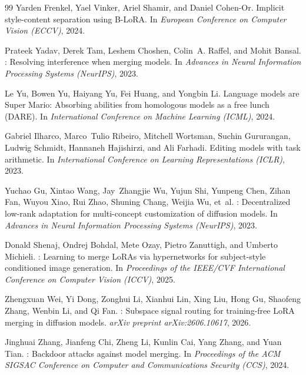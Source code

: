\documentclass[10pt,twocolumn,letterpaper]{article}
\begin{document}
\begin{thebibliography}{99}
Yarden Frenkel, Yael Vinker, Ariel Shamir, and Daniel Cohen-Or.
\newblock Implicit style-content separation using {B-LoRA}.
\newblock In \emph{European Conference on Computer Vision (ECCV)}, 2024.

Prateek Yadav, Derek Tam, Leshem Choshen, Colin~A. Raffel, and Mohit Bansal.
: Resolving interference when merging models.
\newblock In \emph{Advances in Neural Information Processing Systems (NeurIPS)}, 2023.

Le Yu, Bowen Yu, Haiyang Yu, Fei Huang, and Yongbin Li.
\newblock Language models are Super Mario: Absorbing abilities from homologous models as a free lunch ({DARE}).
\newblock In \emph{International Conference on Machine Learning (ICML)}, 2024.

Gabriel Ilharco, Marco~Tulio Ribeiro, Mitchell Wortsman, Suchin Gururangan, Ludwig Schmidt, Hannaneh Hajishirzi, and Ali Farhadi.
\newblock Editing models with task arithmetic.
\newblock In \emph{International Conference on Learning Representations (ICLR)}, 2023.

Yuchao Gu, Xintao Wang, Jay~Zhangjie Wu, Yujun Shi, Yunpeng Chen, Zihan Fan, Wuyou Xiao, Rui Zhao, Shuning Chang, Weijia Wu, et~al.
: Decentralized low-rank adaptation for multi-concept customization of diffusion models.
\newblock In \emph{Advances in Neural Information Processing Systems (NeurIPS)}, 2023.

Donald Shenaj, Ondrej Bohdal, Mete Ozay, Pietro Zanuttigh, and Umberto Michieli.
: Learning to merge {LoRAs} via hypernetworks for subject-style conditioned image generation.
\newblock In \emph{Proceedings of the IEEE/CVF International Conference on Computer Vision (ICCV)}, 2025.

Zhengxuan Wei, Yi Dong, Zonghui Li, Xianhui Lin, Xing Liu, Hong Gu, Shaofeng Zhang, Wenbin Li, and Qi Fan.
: Subspace signal routing for training-free {LoRA} merging in diffusion models.
\newblock \emph{arXiv preprint arXiv:2606.10617}, 2026.

Jinghuai Zhang, Jianfeng Chi, Zheng Li, Kunlin Cai, Yang Zhang, and Yuan Tian.
: Backdoor attacks against model merging.
\newblock In \emph{Proceedings of the ACM SIGSAC Conference on Computer and Communications Security (CCS)}, 2024.


\end{thebibliography}
\end{document}
